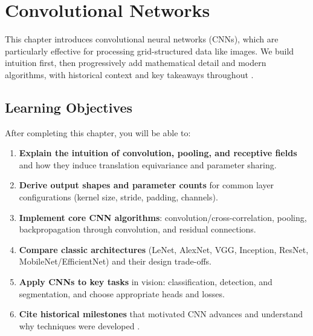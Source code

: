 
\chapter{Convolutional Networks}
\label{chap:convolutional-networks}

This chapter introduces convolutional neural networks (CNNs), which are particularly effective for processing grid-structured data like images. We build intuition first, then progressively add mathematical detail and modern algorithms, with historical context and key takeaways throughout \cite{GoodfellowEtAl2016,Prince2023}.

\section*{Learning Objectives}
\label{sec:ch9-learning-objectives}

After completing this chapter, you will be able to:

\begin{enumerate}
    \item \textbf{Explain the intuition of convolution, pooling, and receptive fields} and how they induce translation equivariance and parameter sharing.
    \item \textbf{Derive output shapes and parameter counts} for common layer configurations (kernel size, stride, padding, channels).
    \item \textbf{Implement core CNN algorithms}: convolution/cross-correlation, pooling, backpropagation through convolution, and residual connections.
    \item \textbf{Compare classic architectures} (LeNet, AlexNet, VGG, Inception, ResNet, MobileNet/EfficientNet) and their design trade-offs.
    \item \textbf{Apply CNNs to key tasks} in vision: classification, detection, and segmentation, and choose appropriate heads and losses.
    \item \textbf{Cite historical milestones} that motivated CNN advances and understand why techniques were developed \cite{LeCun1989,Krizhevsky2012,He2016,Ronneberger2015}.
\end{enumerate}










% 



